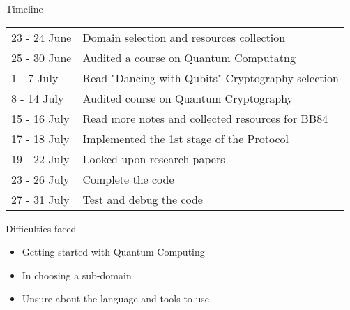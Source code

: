 \documentclass{beamer}
\begin{document}
\begin{frame}{Timeline}
    \begin{tabular}{ll}
            23 - 24 June & Domain selection and resources collection\\
            25 - 30 June & Audited a course on Quantum Computatng\\
            1 - 7 July & Read "Dancing with Qubits" Cryptography selection\\
            8 - 14 July & Audited course on Quantum Cryptography\\
            15 - 16 July & Read more notes and collected resources for BB84\\
            17 - 18 July & Implemented the 1st stage of the Protocol\\
            19 - 22 July & Looked upon research papers\\
            23 - 26 July & Complete the code\\
            27 - 31 July & Test and debug the code\\
     \end{tabular}
\end{frame}

\begin{frame}{Difficulties faced}
	\begin{itemize}
		\item Getting started with Quantum Computing
        \item In choosing a sub-domain
        \item Unsure about the language and tools to use
	\end{itemize}
\end{frame}
		
\end{document}
